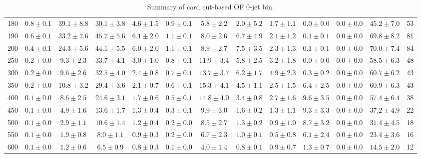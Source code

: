 \begin{table}
{\begin{center}
\begin{tabular}{l | c c | c c c c c c c c  | c c}
180 & $0.8\pm0.1$ & $39.1\pm8.8$ & $30.1\pm3.8$ & $4.6\pm1.5$ & $0.9\pm0.1$ & $5.8\pm2.2$ & $2.0\pm5.2$ & $1.7\pm1.1$ & $0.0\pm0.0$ & $0.0\pm0.0$ & $45.2\pm7.0$ & 53 \\
190 & $0.6\pm0.1$ & $33.2\pm7.6$ & $45.7\pm5.6$ & $6.1\pm2.0$ & $1.1\pm0.1$ & $8.0\pm2.6$ & $6.7\pm4.9$ & $2.1\pm1.2$ & $0.1\pm0.1$ & $0.0\pm0.0$ & $69.8\pm8.2$ & 81 \\
200 & $0.4\pm0.1$ & $24.3\pm5.6$ & $44.1\pm5.5$ & $6.0\pm2.0$ & $1.1\pm0.1$ & $8.9\pm2.7$ & $7.5\pm3.5$ & $2.3\pm1.3$ & $0.1\pm0.1$ & $0.0\pm0.0$ & $70.0\pm7.4$ & 84 \\
250 & $0.2\pm0.0$ & $9.3\pm2.3$ & $33.7\pm4.1$ & $3.0\pm1.0$ & $0.8\pm0.1$ & $11.9\pm3.4$ & $5.8\pm2.5$ & $3.2\pm1.8$ & $0.0\pm0.0$ & $0.0\pm0.0$ & $58.5\pm6.3$ & 48 \\
300 & $0.2\pm0.0$ & $9.6\pm2.6$ & $32.5\pm4.0$ & $2.4\pm0.8$ & $0.7\pm0.1$ & $13.7\pm3.7$ & $6.2\pm1.7$ & $4.9\pm2.3$ & $0.3\pm0.2$ & $0.0\pm0.0$ & $60.7\pm6.2$ & 43 \\
350 & $0.2\pm0.0$ & $10.8\pm3.2$ & $29.4\pm3.6$ & $2.1\pm0.7$ & $0.6\pm0.1$ & $15.3\pm4.1$ & $4.5\pm1.1$ & $2.5\pm1.5$ & $6.4\pm2.5$ & $0.0\pm0.0$ & $60.9\pm6.3$ & 43 \\
400 & $0.1\pm0.0$ & $8.6\pm2.5$ & $24.6\pm3.1$ & $1.7\pm0.6$ & $0.5\pm0.1$ & $14.8\pm4.0$ & $3.4\pm0.8$ & $2.7\pm1.6$ & $9.6\pm3.5$ & $0.0\pm0.0$ & $57.4\pm6.4$ & 38 \\
450 & $0.1\pm0.0$ & $4.9\pm1.6$ & $13.6\pm1.7$ & $1.3\pm0.4$ & $0.3\pm0.1$ & $9.9\pm3.0$ & $1.6\pm0.2$ & $1.3\pm1.1$ & $9.3\pm3.3$ & $0.0\pm0.0$ & $37.2\pm4.9$ & 22 \\
500 & $0.1\pm0.0$ & $2.9\pm1.1$ & $10.6\pm1.4$ & $1.2\pm0.4$ & $0.2\pm0.0$ & $8.5\pm2.7$ & $1.3\pm0.2$ & $0.9\pm1.0$ & $8.7\pm3.2$ & $0.0\pm0.0$ & $31.4\pm4.5$ & 18 \\
550 & $0.1\pm0.0$ & $1.9\pm0.8$ & $8.0\pm1.1$ & $0.9\pm0.3$ & $0.2\pm0.0$ & $6.7\pm2.3$ & $1.0\pm0.1$ & $0.5\pm0.8$ & $6.1\pm2.4$ & $0.0\pm0.0$ & $23.4\pm3.6$ & 16 \\
600 & $0.1\pm0.0$ & $1.2\pm0.6$ & $6.5\pm0.9$ & $0.8\pm0.3$ & $0.1\pm0.0$ & $4.0\pm1.4$ & $0.8\pm0.1$ & $0.9\pm0.7$ & $1.3\pm0.7$ & $0.0\pm0.0$ & $14.5\pm2.0$ & 12 \\
\hline
\end{tabular}
\end{center}
}
\caption{Summary of card cut-based OF 0-jet bin.}
\end{table}
